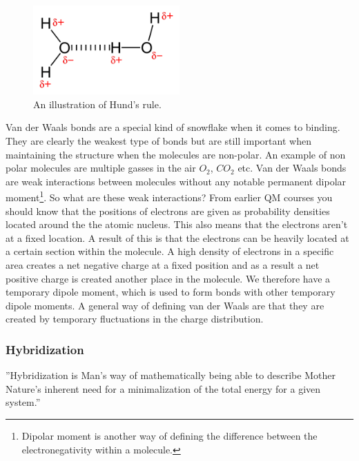 \documentclass[jmp, amsmath, amssymb, reprint]{article}
\numberwithin{equation}{section}
\begin{document}
\begin{multicols}{2}
\begin{figure}[H]
	\centering
  	\includegraphics[width=0.50\textwidth]{hydrogen_bond.png}
	\caption{An illustration of Hund's rule.}%
	\label{fig:hydrogen_bond}
\end{figure}

Van der Waals bonds are a special kind of snowflake when it comes to binding. They are clearly the weakest type of bonds but are still important when maintaining the structure when the molecules are non-polar. An example of non polar molecules are multiple gasses in the air \(O_2\), \(CO_2\) etc. Van der Waals bonds are weak interactions between molecules without any notable permanent dipolar moment\footnote{Dipolar moment is another way of defining the difference between the electronegativity within a molecule.}. So what are these weak interactions? From earlier QM courses you should know that the positions of electrons are given as probability densities located around the the atomic nucleus. This also means that the electrons aren't at a fixed location. A result of this is that the electrons can be heavily located at a certain section within the molecule. A high density of electrons in a specific area creates a net negative charge at a fixed position and as a result a net positive charge is created another place in the molecule. We therefore have a temporary dipole moment, which is used to form bonds with other temporary dipole moments. A general way of defining van der Waals are that they are created by temporary fluctuations in the charge distribution.

\subsubsection{Hybridization}

''Hybridization is Man’s way of mathematically being able to describe Mother Nature’s inherent need for a minimalization of the total energy for a given system.''


\end{multicols}
\end{document}
